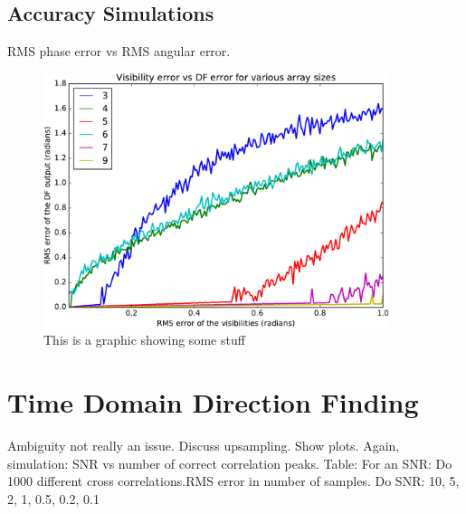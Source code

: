 \subsection{Accuracy Simulations}
RMS phase error vs RMS angular error.
\begin{figure}
  \centering
  \includegraphics[width=0.9\textwidth]{visibility-error-vs-df-error}
  \caption{This is a graphic showing some stuff}
\end{figure}

\section{Time Domain Direction Finding}
Ambiguity not really an issue.
Discuss upsampling. Show plots.
Again, simulation:
SNR vs number of correct correlation peaks.
Table: 
For an SNR: Do 1000 different cross correlations.RMS error in number of samples.
Do SNR: 10, 5, 2, 1, 0.5, 0.2, 0.1
